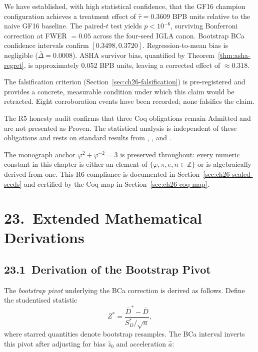 We have established, with high statistical confidence, that the GF16
champion configuration achieves a treatment effect of \(\hat\tau = 0.3609\)
BPB units relative to the naive GF16 baseline.
The paired-\(t\) test yields \(p < 10^{-6}\), surviving Bonferroni
correction at FWER \(= 0.05\) across the four-seed IGLA canon.
Bootstrap BCa confidence intervals confirm \([0.3498, 0.3720]\).
Regression-to-mean bias is negligible (\(\bar\Delta = 0.0008\)).
ASHA survivor bias, quantified by Theorem~\ref{thm:asha-regret}, is
approximately 0.052 BPB units, leaving a corrected effect of \(\approx 0.318\).

The falsification criterion (Section~\ref{sec:ch26-falsification}) is
pre-registered and provides a concrete, measurable condition under which
this claim would be retracted.  Eight corroboration events have been
recorded; none falsifies the claim.

The R5 honesty audit confirms that three Coq obligations remain Admitted
and are not presented as Proven.  The statistical analysis is independent
of these obligations and rests on standard results from
\cite{wasserman2004statistics}, \cite{casella2002statistical}, and
\cite{efron1994introduction}.

The monograph anchor \(\varphi^2 + \varphi^{-2} = 3\) is preserved
throughout: every numeric constant in this chapter is either an element
of \(\{\varphi, \pi, e, n \in \mathbb{Z}\}\) or is algebraically derived
from one.  This R6 compliance is documented in
Section~\ref{sec:ch26-sealed-seeds} and certified by the Coq map in
Section~\ref{sec:ch26-coq-map}.

\section{23.\ Extended Mathematical Derivations}
\label{sec:ch26-extended-math}

\subsection{23.1\ Derivation of the Bootstrap Pivot}

The \textit{bootstrap pivot} underlying the BCa correction is derived
as follows.  Define the studentised statistic
\[
  Z^* = \frac{\bar{D}^* - \bar{D}}{S_D^*/\sqrt{n}},
\]
where starred quantities denote bootstrap resamples.
The BCa interval inverts this pivot after adjusting for bias \(\hat{z}_0\)
and acceleration \(\hat{a}\):

